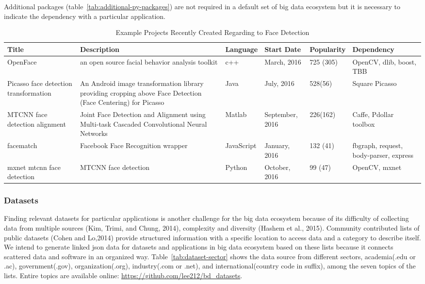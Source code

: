 \documentclass[9pt,twocolumn,twoside]{styles/osajnl}
\begin{document}
Additional packages (table~\ref{tab:additional-py-packages}) are not required
in a default set of big data ecosystem but it is necessary to indicate the
dependency with a particular application. 

\begin{table}[htb]
  \begin{center}
    \begin{small}
      \begin{tabular}{p{2cm}|p{5cm}|l|l|l|p{3cm}}

    Title & Description & Language & Start Date & Popularity & Dependency \\ \hline  \hline
    OpenFace &  an open source facial behavior analysis toolkit & c++ & March, 2016 & 725 (305) & OpenCV, dlib, boost, TBB \\ \hline
    Picasso face detection transformation & An Android image transformation library providing cropping above Face Detection (Face Centering) for Picasso & Java & July, 2016 & 528(56) & Square Picasso \\ \hline
    MTCNN face detection alignment & Joint Face Detection and Alignment using Multi-task Cascaded Convolutional Neural Networks & Matlab & September, 2016 & 226(162)  &  Caffe, Pdollar toolbox \\ \hline
    facematch & Facebook Face Recognition wrapper & JavaScript & January, 2016 & 132 (41) & fbgraph, request, body-parser, express \\ \hline
    mxnet mtcnn face detection & MTCNN face detection & Python  & October, 2016 & 99 (47) & OpenCV, mxnet \\ 


  \end{tabular}
  \caption{Example Projects Recently Created Regarding to Face Detection}
  \label{tab:project-examples-face}
\end{small}
  \end{center}
\end{table}


\subsubsection{Datasets}

Finding relevant datasets for particular applications is another challenge for
the big data ecosystem because of its difficulty of collecting data from
multiple sources (Kim, Trimi, and Chung, 2014), complexity and diversity
(Hashem et al., 2015). Community contributed lists of public datasets (Cohen
and Lo,2014) provide structured information with a specific location to access
data and a category to describe itself. We intend to generate linked json data
for datasets and applications in big data ecosystem based on these lists
because it connects scattered data and software in an organized way.
Table~\ref{tab:dataset-sector} shows the data source from different sectors,
academia(.edu or .ac), government(.gov), organization(.org), industry(.com or
.net), and international(country code in suffix), among the seven topics of the
lists. Entire topics are available online:
\url{https://github.com/lee212/bd_datasets}.
\end{document}
